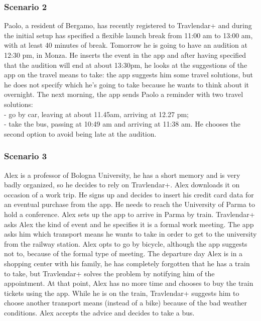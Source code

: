 	\subsubsection{Scenario 2}
	Paolo, a resident of Bergamo, has recently registered to Travlendar+ and during	the initial setup has specified a flexible launch break from 11:00 am to 13:00 am, with at least 40 minutes of break.\newline
	Tomorrow he is going to have an audition at 12:30 pm, in Monza. He inserts the event in the app and after having specified that the audition will end at about 13:30pm, he looks at the suggestions of the app on the travel means to take: the app suggests him some travel solutions, but he does not specify which he's going to take because he wants to think about it overnight.\newline
	The next morning, the app sends Paolo a reminder with two travel solutions:\\
	\indent- go by car, leaving at about 11.45am, arriving at 12.27 pm;\\
	\indent - take the bus, passing at 10:49 am and arriving at 11:38 am.
	\newline He chooses the second option to avoid being late at the audition.
	\subsubsection{Scenario 3}
	Alex is a professor of Bologna University, he has a short memory and is very badly organized, so he decides to rely on Travlendar+. Alex downloads it on occasion of a work trip. He signs up and decides to insert his credit card data for an eventual purchase from the app.\newline
	He needs to reach the University of Parma to hold a conference. Alex sets up the app to arrive in Parma by train. Travlendar+ asks Alex the kind of event and he specifies it is a formal work meeting. The app asks him which transport means he wants to take in order to get to the university from the railway station. Alex opts to go by bicycle, although the app suggests not to, because of the formal type of meeting.\newline
	The departure day Alex is in a shopping center with his family, he has completely forgotten that he has a train to take, but Travlendar+ solves the problem by notifying him of the appointment. At that point, Alex has no more time and chooses to buy the train tickets using the app. While he is on the train, Travlendar+ suggests him to choose another transport means (instead of a bike) because of the bad weather conditions. Alex accepts the advice and decides to take a bus.
